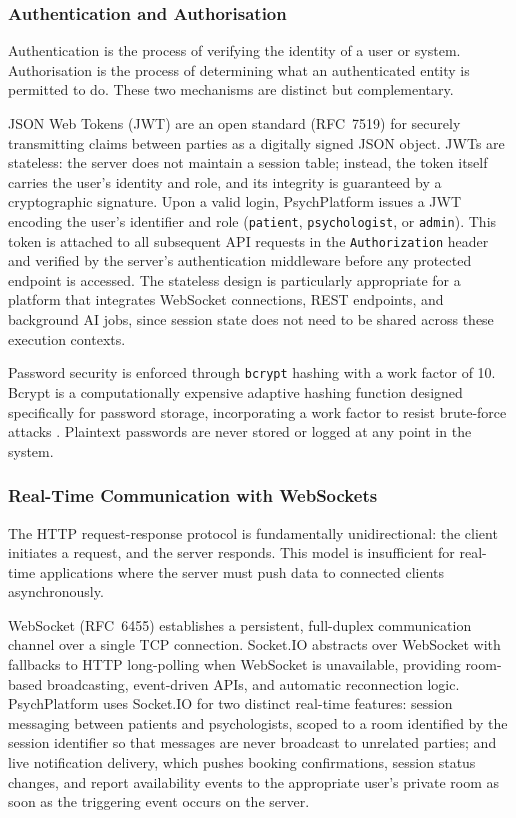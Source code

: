 \documentclass[a4paper,12pt]{report}
\begin{document}
\subsubsection{Authentication and Authorisation}

Authentication is the process of verifying the identity of a user or system. Authorisation is the process of determining what an authenticated entity is permitted to do. These two mechanisms are distinct but complementary.

JSON Web Tokens (JWT) are an open standard (RFC~7519) for securely transmitting claims between parties as a digitally signed JSON object. JWTs are stateless: the server does not maintain a session table; instead, the token itself carries the user's identity and role, and its integrity is guaranteed by a cryptographic signature. Upon a valid login, PsychPlatform issues a JWT encoding the user's identifier and role (\texttt{patient}, \texttt{psychologist}, or \texttt{admin}). This token is attached to all subsequent API requests in the \texttt{Authorization} header and verified by the server's authentication middleware before any protected endpoint is accessed. The stateless design is particularly appropriate for a platform that integrates WebSocket connections, REST endpoints, and background AI jobs, since session state does not need to be shared across these execution contexts.

Password security is enforced through \texttt{bcrypt} hashing with a work factor of 10. Bcrypt is a computationally expensive adaptive hashing function designed specifically for password storage, incorporating a work factor to resist brute-force attacks \cite{Provos1999}. Plaintext passwords are never stored or logged at any point in the system.

\subsubsection{Real-Time Communication with WebSockets}

The HTTP request-response protocol is fundamentally unidirectional: the client initiates a request, and the server responds. This model is insufficient for real-time applications where the server must push data to connected clients asynchronously.

WebSocket (RFC~6455) establishes a persistent, full-duplex communication channel over a single TCP connection. Socket.IO abstracts over WebSocket with fallbacks to HTTP long-polling when WebSocket is unavailable, providing room-based broadcasting, event-driven APIs, and automatic reconnection logic. PsychPlatform uses Socket.IO for two distinct real-time features: session messaging between patients and psychologists, scoped to a room identified by the session identifier so that messages are never broadcast to unrelated parties; and live notification delivery, which pushes booking confirmations, session status changes, and report availability events to the appropriate user's private room as soon as the triggering event occurs on the server.
\end{document}
